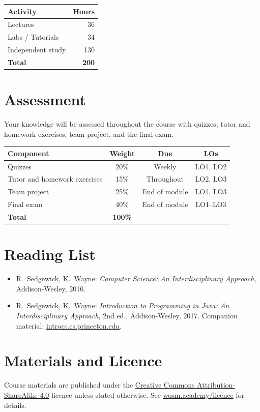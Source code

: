 \documentclass[11pt,a4paper]{article}
\begin{document}
\begin{tabularx}{0.6\textwidth}{X r}
\toprule
\textbf{Activity} & \textbf{Hours} \\
\midrule
Lectures            & 36 \\
Labs / Tutorials    & 34 \\
Independent study   & 130 \\
\midrule
\textbf{Total}      & \textbf{200} \\
\bottomrule
\end{tabularx}

\section{Assessment}
Your knowledge will be assessed throughout the course with quizzes, tutor and
homework exercises, team project, and the final exam.

\begin{tabularx}{\textwidth}{X c c c}
\toprule
\textbf{Component} & \textbf{Weight} & \textbf{Due} & \textbf{LOs} \\
\midrule
Quizzes & 20\% & Weekly & LO1, LO2 \\
Tutor and homework exercises & 15\% & Throughout & LO2, LO3 \\
Team project & 25\% & End of module & LO1, LO3 \\
Final exam & 40\% & End of module & LO1--LO3 \\
\midrule
\textbf{Total} & \textbf{100\%} & & \\
\bottomrule
\end{tabularx}

\section{Reading List}
\begin{itemize}
  \item R.\ Sedgewick, K.\ Wayne: \textit{Computer Science: An Interdisciplinary
        Approach}, Addison-Wesley, 2016.
  \item R.\ Sedgewick, K.\ Wayne: \textit{Introduction to Programming in Java: An
        Interdisciplinary Approach}, 2nd ed., Addison-Wesley, 2017. Companion material:
        \href{https://introcs.cs.princeton.edu/java/home}{introcs.cs.princeton.edu}.
\end{itemize}

\section{Materials and Licence}
Course materials are published under the
\href{https://creativecommons.org/licenses/by-sa/4.0/}{Creative Commons Attribution-ShareAlike 4.0}
licence unless stated otherwise. See \href{https://wosm.academy/licence/}{wosm.academy/licence} for details.
\end{document}
